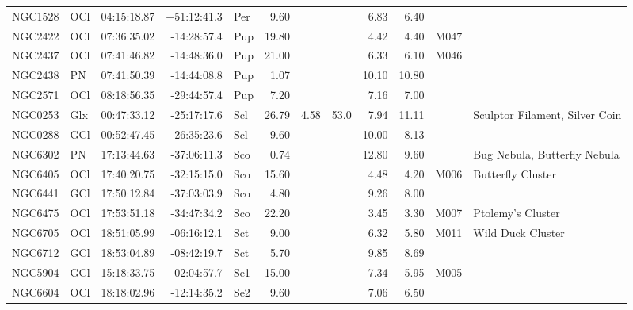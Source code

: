 \documentclass[11pt]{article}
\begin{document}
\begin{longtable}{llrrlrrrrrrl}
  NGC1528 & OCl     & 04:15:18.87 & +51:12:41.3 & Per   & 9.60   &        &       & 6.83  & 6.40  &         &                                \\
  NGC2422 & OCl     & 07:36:35.02 & -14:28:57.4 & Pup   & 19.80  &        &       & 4.42  & 4.40  & M047    &                                \\
  NGC2437 & OCl     & 07:41:46.82 & -14:48:36.0 & Pup   & 21.00  &        &       & 6.33  & 6.10  & M046    &                                \\
  NGC2438 & PN      & 07:41:50.39 & -14:44:08.8 & Pup   & 1.07   &        &       & 10.10 & 10.80 &         &                                \\
  NGC2571 & OCl     & 08:18:56.35 & -29:44:57.4 & Pup   & 7.20   &        &       & 7.16  & 7.00  &         &                                \\
  NGC0253 & Glx     & 00:47:33.12 & -25:17:17.6 & Scl   & 26.79  & 4.58   & 53.0  & 7.94  & 11.11 &         & Sculptor Filament, Silver Coin \\
  NGC0288 & GCl     & 00:52:47.45 & -26:35:23.6 & Scl   & 9.60   &        &       & 10.00 & 8.13  &         &                                \\
  NGC6302 & PN      & 17:13:44.63 & -37:06:11.3 & Sco   & 0.74   &        &       & 12.80 & 9.60  &         & Bug Nebula, Butterfly Nebula   \\
  NGC6405 & OCl     & 17:40:20.75 & -32:15:15.0 & Sco   & 15.60  &        &       & 4.48  & 4.20  & M006    & Butterfly Cluster              \\
  NGC6441 & GCl     & 17:50:12.84 & -37:03:03.9 & Sco   & 4.80   &        &       & 9.26  & 8.00  &         &                                \\
  NGC6475 & OCl     & 17:53:51.18 & -34:47:34.2 & Sco   & 22.20  &        &       & 3.45  & 3.30  & M007    & Ptolemy's Cluster              \\
  NGC6705 & OCl     & 18:51:05.99 & -06:16:12.1 & Sct   & 9.00   &        &       & 6.32  & 5.80  & M011    & Wild Duck Cluster              \\
  NGC6712 & GCl     & 18:53:04.89 & -08:42:19.7 & Sct   & 5.70   &        &       & 9.85  & 8.69  &         &                                \\
  NGC5904 & GCl     & 15:18:33.75 & +02:04:57.7 & Se1   & 15.00  &        &       & 7.34  & 5.95  & M005    &                                \\
  NGC6604 & OCl     & 18:18:02.96 & -12:14:35.2 & Se2   & 9.60   &        &       & 7.06  & 6.50  &         &                                \\

\end{longtable}
\end{document}
